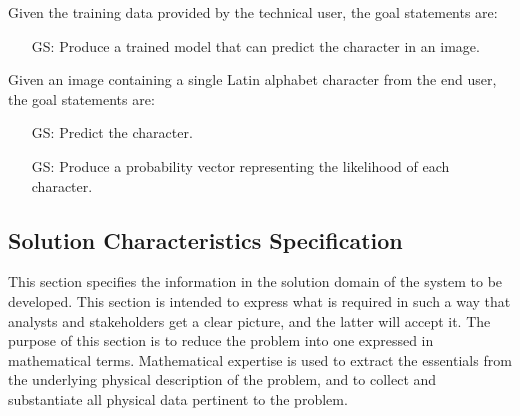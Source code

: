 \documentclass[12pt]{article}
\newcounter{goalnum} %
\begin{document}
\noindent Given the training data provided by the technical user, the goal
statements are:

\begin{itemize}

\item[GS\refstepcounter{goalnum}\thegoalnum \label{G_train}:] Produce a trained
model that can predict the character in an image.

\end{itemize}

\noindent Given an image containing a single Latin alphabet character from the
end user, the goal statements are:

\begin{itemize}

\item[GS\refstepcounter{goalnum}\thegoalnum \label{G_predict}:] Predict the character.
\item[GS\refstepcounter{goalnum}\thegoalnum \label{G_probability}:] Produce a probability vector
representing the likelihood of each character.

\end{itemize}

\subsection{Solution Characteristics Specification}

This section specifies the information in the solution domain of the system
to be developed. This section is intended to express what is required in
such a way that analysts and stakeholders get a clear picture, and the
latter will accept it. The purpose of this section is to reduce the problem
into one expressed in mathematical terms. Mathematical expertise is used to
extract the essentials from the underlying physical description of the
problem, and to collect and substantiate all physical data pertinent to the
problem.

\end{document}
